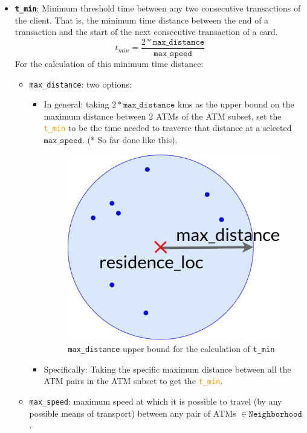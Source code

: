 \documentclass{article}
\begin{document}
\begin{itemize}
    \item \textbf{\texttt{t\_min}}: Minimum threshold time between any two consecutive 
    transactions of the client. That is, the minimum time distance between the end of 
    a transaction and the start of the next consecutive transaction of a card. 
    $$t_{min} = \frac{2 * \texttt{max\_distance}}{\texttt{max\_speed}}$$
    For the calculation of this minimum time distance:
    \begin{itemize}
      \item \texttt{max\_distance}: two options:  
        \begin{itemize}
          \item In general: taking $2*\texttt{max\_distance}$ kms as the upper bound on 
          the maximum distance between 2 ATMs of the ATM subset, set the 
          \textcolor{orange}{\texttt{t\_min}} to be the time needed to traverse that distance 
          at a selected $\texttt{max\_speed}$. (* So far done like this). 
          \begin{figure}[H]
            \centering
            \includegraphics[scale=0.5]{images/tx-generation-tmin.png}
            \caption{\texttt{max\_distance} upper bound for the calculation of \texttt{t\_min}}
        \end{figure}    
          \item Specifically: Taking the specific maximum distance between all the ATM pairs 
          in the ATM subset to get the \textcolor{orange}{\texttt{t\_min}}.
      \end{itemize}  
      \item \texttt{max\_speed}: maximum speed at which it is possible to travel 
      (by any possible means of transport) between any pair of ATMs $\in 
      \ \texttt{Neighborhood}$.
    \end{itemize}


\end{itemize}
\end{document}
